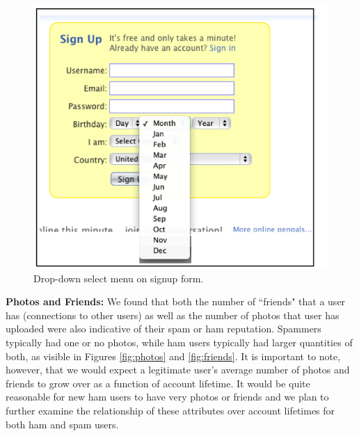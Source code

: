 \documentclass[preprint]{acm_proc_article-sp}
\begin{document}
\begin{figure}[h]
    \centering
    \includegraphics[width=\linewidth]{figures/dropdown.png}
    \caption{Drop-down select menu on signup form.}
    \label{fig:drop}
\end{figure}



\textbf{Photos and Friends:} We found that both the number of ``friends" that a user has (connections 
to other users) as well as the number of photos that user has uploaded were also indicative of their 
spam or ham reputation. Spammers typically had one or no photos, while ham users typically had larger 
quantities of both, as visible in Figures \ref{fig:photos} and \ref{fig:friends}. It is important to note, 
however, that we would expect a legitimate user's average number of photos and friends to grow over 
as a function of account lifetime. It would be quite reasonable for new ham users to have very photos 
or friends and we plan to further examine the relationship of these attributes over account lifetimes 
for both ham and spam users.
\end{document}
